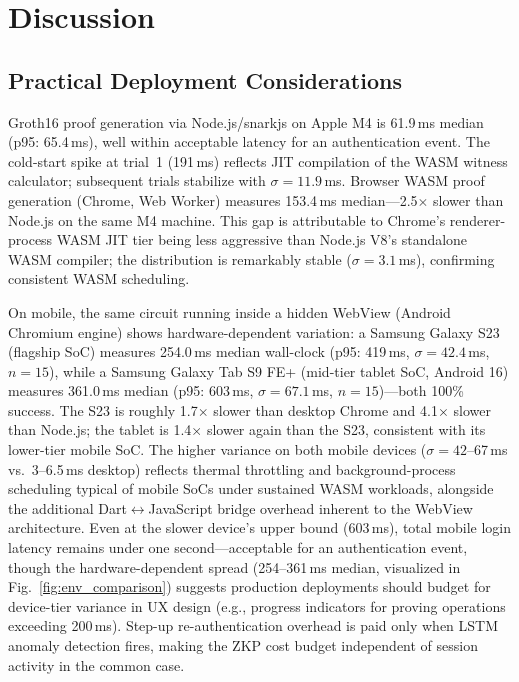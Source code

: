 \documentclass[journal,twoside,10pt]{IEEEtran}
\begin{document}
\section{Discussion}
\label{sec:discussion}

\subsection{Practical Deployment Considerations}

Groth16 proof generation via Node.js/snarkjs on Apple M4 is 61.9\,ms median
(p95: 65.4\,ms), well within acceptable latency for an authentication
event. The cold-start spike at trial~1 (191\,ms) reflects JIT compilation
of the WASM witness calculator; subsequent trials stabilize with
$\sigma=11.9$\,ms. Browser WASM proof generation (Chrome, Web Worker)
measures 153.4\,ms median---2.5$\times$ slower than Node.js on the same M4
machine. This gap is attributable to Chrome's renderer-process WASM JIT
tier being less aggressive than Node.js V8's standalone WASM compiler; the
distribution is remarkably stable ($\sigma=3.1$\,ms), confirming consistent
WASM scheduling.

On mobile, the same circuit running inside a hidden WebView (Android
Chromium engine) shows hardware-dependent variation: a Samsung Galaxy S23
(flagship SoC) measures 254.0\,ms median wall-clock (p95: 419\,ms,
$\sigma=42.4$\,ms, $n=15$), while a Samsung Galaxy Tab S9 FE+ (mid-tier
tablet SoC, Android 16) measures 361.0\,ms median (p95: 603\,ms,
$\sigma=67.1$\,ms, $n=15$)---both 100\% success. The S23 is roughly
1.7$\times$ slower than desktop Chrome and 4.1$\times$ slower than Node.js;
the tablet is 1.4$\times$ slower again than the S23, consistent with its
lower-tier mobile SoC. The higher variance on both mobile devices
($\sigma=42$--67\,ms vs.\ 3--6.5\,ms desktop) reflects thermal throttling
and background-process scheduling typical of mobile SoCs under sustained
WASM workloads, alongside the additional Dart$\leftrightarrow$JavaScript
bridge overhead inherent to the WebView architecture. Even at the slower
device's upper bound (603\,ms), total mobile login latency remains under
one second---acceptable for an authentication event, though the
hardware-dependent spread (254--361\,ms median, visualized in
Fig.~\ref{fig:env_comparison}) suggests production deployments should
budget for device-tier variance in UX design (e.g., progress indicators for
proving operations exceeding 200\,ms). Step-up re-authentication overhead
is paid only when LSTM anomaly detection fires, making the ZKP cost budget
independent of session activity in the common case.
\end{document}
